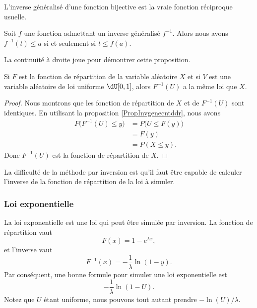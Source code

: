\begin{remark}
    L'inverse généralisé d'une fonction bijective est la vraie fonction réciproque usuelle.
\end{remark}

\begin{proposition}     \label{PropInvgenecntddr}
    Soit \( f\) une fonction admettant un inverse généralisé \( f^{-1}\). Alors nous avons \( f^{-1}(t)\leq a\) si et seulement si \( t\leq f(a)\).
\end{proposition}
La continuité à droite joue pour démontrer cette proposition.


\begin{proposition}
    Si \( F\) est la fonction de répartition de la variable aléatoire \( X\) et si \( V\) est une variable aléatoire de loi uniforme \( \dU\mathopen[ 0 , 1 \mathclose]\), alors \( F^{-1}(U)\) a la même loi que \( X\).
\end{proposition}

\begin{proof}
    Nous montrons que les fonction de répartition de \( X\) et de \( F^{-1}(U)\) sont identiques. En utilisant la proposition \ref{PropInvgenecntddr}, nous avons
    \begin{subequations}
        \begin{align}
            P\big( F^{-1}(U)\leq y \big)&=P\big( U\leq F(y) \big)\\
            &=F(y)\\
            &=P(X\leq y).
        \end{align}
    \end{subequations}
    Donc \( F^{-1}(U)\) est la fonction de répartition de \( X\).
\end{proof}

La difficulté de la méthode par inversion est qu'il faut être capable de calculer l'inverse de la fonction de répartition de la loi à simuler.

\subsubsection{Loi exponentielle}

La loi exponentielle est une loi qui peut être simulée par inversion. La fonction de répartition vaut
\begin{equation}
    F(x)=1- e^{\lambda x},
\end{equation}
et l'inverse vaut
\begin{equation}
    F^{-1}(x)=-\frac{1}{ \lambda }\ln(1-y).
\end{equation}
Par conséquent, une bonne formule pour simuler une loi exponentielle est
\begin{equation}
    -\frac{1}{ \lambda }\ln(1-U).
\end{equation}
Notez que \( U\) étant uniforme, nous pouvons tout autant prendre \( -\ln(U)/\lambda\).

